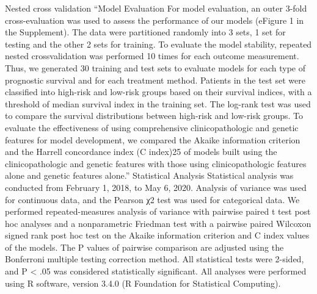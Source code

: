 \documentclass{article}%
\begin{document}
\newline%
%
%
\newline%
\newline%
%
Nested cross validation %
\newline%
\newline%
%
“Model Evaluation For model evaluation, an outer 3{-}fold cross{-}evaluation was used to assess the performance of our models (eFigure 1 in the Supplement). The data were partitioned randomly into 3 sets, 1 set for testing and the other 2 sets for training. To evaluate the model stability, repeated nested crossvalidation was performed 10 times for each outcome measurement. Thus, we generated 30 training and test sets to evaluate models for each type of prognostic survival and for each treatment method. Patients in the test set were classified into high{-}risk and low{-}risk groups based on their survival indices, with a threshold of median survival index in the training set. The log{-}rank test was used to compare the survival distributions between high{-}risk and low{-}risk groups. To evaluate the effectiveness of using comprehensive clinicopathologic and genetic features for model development, we compared the Akaike information criterion and the Harrell concordance index (C index)25 of models built using the clinicopathologic and genetic features with those using clinicopathologic features alone and genetic features alone.”%
\newline%
\newline%
%
%
\newline%
\newline%
%
Statistical Analysis Statistical analysis was conducted from February 1, 2018, to May 6, 2020. Analysis of variance was used for continuous data, and the Pearson χ2 test was used for categorical data. We performed repeated{-}measures analysis of variance with pairwise paired t test post hoc analyses and a nonparametric Friedman test with a pairwise paired Wilcoxon signed rank post hoc test on the Akaike information criterion and C index values of the models. The P values of pairwise comparison are adjusted using the Bonferroni multiple testing correction method. All statistical tests were 2{-}sided, and P < .05 was considered statistically significant. All analyses were performed using R software, version 3.4.0 (R Foundation for Statistical Computing).%
\newline%
\newline%
%
%
\newline%
\newline%
\end{document}
